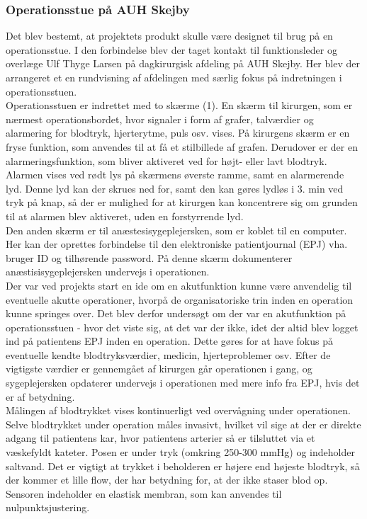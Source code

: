 \subsubsection{Operationsstue på AUH Skejby}
Det blev bestemt, at projektets produkt skulle være designet til brug på en operationsstue. I den forbindelse blev der taget kontakt til funktionsleder og overlæge Ulf Thyge Larsen på dagkirurgisk afdeling på AUH Skejby. Her blev der arrangeret et en rundvisning af afdelingen med særlig fokus på indretningen i operationsstuen.\\
\newline
Operationsstuen er indrettet med to skærme (1). En skærm til kirurgen, som er nærmest operationsbordet, hvor signaler i form af grafer, talværdier og alarmering for blodtryk, hjerterytme, puls osv. vises. På kirurgens skærm er en fryse funktion, som anvendes til at få et stilbillede af grafen. Derudover er der en alarmeringsfunktion, som bliver aktiveret ved for højt- eller lavt blodtryk. Alarmen vises ved rødt lys på skærmens øverste ramme, samt en alarmerende lyd. Denne lyd kan der skrues ned for, samt den kan gøres lydløs i 3. min ved tryk på knap, så der er mulighed for at kirurgen kan koncentrere sig om grunden til at alarmen blev aktiveret, uden en forstyrrende lyd.\\
\newline
Den anden skærm er til anæstesisygeplejersken, som er koblet til en computer. Her kan der oprettes forbindelse til den elektroniske patientjournal (EPJ) vha. bruger ID og tilhørende password. På denne skærm dokumenterer anæstisisygeplejersken undervejs i operationen.\\
\newline
Der var ved projekts start en ide om en akutfunktion kunne være anvendelig til eventuelle akutte operationer, hvorpå de organisatoriske trin inden en operation kunne springes over. Det blev derfor undersøgt om der var en akutfunktion på operationsstuen - hvor det viste sig, at det var der ikke, idet der altid blev logget ind på patientens EPJ inden en operation. Dette gøres for at have fokus på eventuelle kendte blodtryksværdier, medicin, hjerteproblemer osv. Efter de vigtigste værdier er gennemgået af kirurgen går operationen i gang, og sygeplejersken opdaterer undervejs i operationen med mere info fra EPJ, hvis det er af betydning. \\
\newline
Målingen af blodtrykket vises kontinuerligt ved overvågning under operationen. Selve blodtrykket under operation måles invasivt, hvilket vil sige at der er direkte adgang til patientens kar, hvor patientens arterier så er tilsluttet via et væskefyldt kateter. Posen er under tryk (omkring 250-300 mmHg) og indeholder saltvand. Det er vigtigt at trykket i beholderen er højere end højeste blodtryk, så der kommer et lille flow, der har betydning for, at der ikke staser blod op. Sensoren indeholder en elastisk membran, som kan anvendes til nulpunktsjustering. \\
